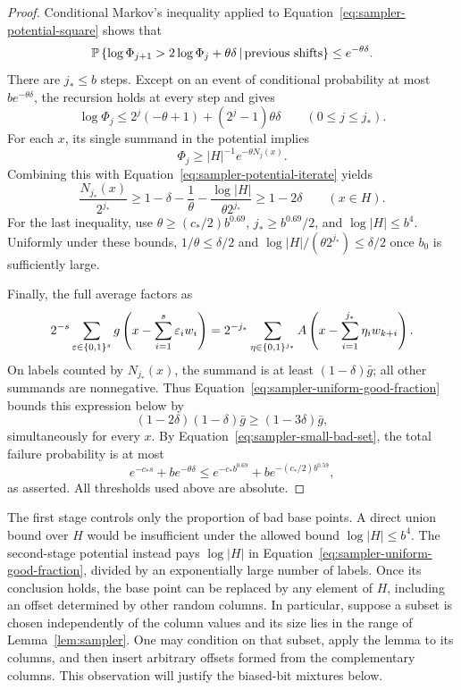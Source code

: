 \begin{proof}
Conditional Markov's inequality applied to
Equation~\eqref{eq:sampler-potential-square} shows that
\[
 \mathbb P\left\{
    \log\Phi_{j+1}>2\log\Phi_j+\theta\delta
    \,\middle|\,\text{previous shifts}
 \right\}
 \le e^{-\theta\delta}.
\]
There are $j_*\le b$ steps. Except on an event of conditional probability
at most $b e^{-\theta\delta}$, the recursion holds at every step and gives
\begin{equation}
\label{eq:sampler-potential-iterate}
 \log\Phi_j
 \le 2^j(-\theta+1)+(2^j-1)\theta\delta
 \qquad(0\le j\le j_*).
\end{equation}
For each $x$, its single summand in the potential implies
\[
 \Phi_j\ge |H|^{-1}e^{-\theta N_j(x)}.
\]
Combining this with Equation~\eqref{eq:sampler-potential-iterate} yields
\begin{equation}
\label{eq:sampler-uniform-good-fraction}
 \frac{N_{j_*}(x)}{2^{j_*}}
 \ge 1-\delta-\frac1\theta
             -\frac{\log|H|}{\theta 2^{j_*}}
 \ge 1-2\delta
 \qquad(x\in H).
\end{equation}
For the last inequality, use
$\theta\ge(c_*/2)b^{0.69}$, $j_*\ge b^{0.69}/2$, and
$\log|H|\le b^4$. Uniformly under these bounds,
$1/\theta\le\delta/2$ and
$\log|H|/(\theta2^{j_*})\le\delta/2$ once $b_0$ is sufficiently large.

Finally, the full average factors as
\[
 2^{-s}\sum_{\varepsilon\in\{0,1\}^s}
 g\left(x-\sum_{i=1}^s\varepsilon_iw_i\right)
 =2^{-j_*}\sum_{\eta\in\{0,1\}^{j_*}}
 A\left(x-\sum_{i=1}^{j_*}\eta_iw_{k+i}\right).
\]
On labels counted by $N_{j_*}(x)$, the summand is at least
$(1-\delta)\bar g$; all other summands are nonnegative. Thus
Equation~\eqref{eq:sampler-uniform-good-fraction} bounds this expression
below by
\[
 (1-2\delta)(1-\delta)\bar g
 \ge(1-3\delta)\bar g,
\]
simultaneously for every $x$. By
Equation~\eqref{eq:sampler-small-bad-set}, the total failure probability
is at most
\[
 e^{-c_*s}+b e^{-\theta\delta}
 \le e^{-c_*b^{0.69}}
      +b e^{-(c_*/2)b^{0.59}},
\]
as asserted. All thresholds used above are absolute.
\end{proof}

\begin{remark}
The first stage controls only the proportion of bad base points. A direct
union bound over $H$ would be insufficient under the allowed bound
$\log|H|\le b^4$. The second-stage potential instead pays
$\log|H|$ in Equation~\eqref{eq:sampler-uniform-good-fraction}, divided by
an exponentially large number of labels. Once its conclusion holds, the
base point can be replaced by any element of $H$, including an offset
determined by other random columns. In particular, suppose a subset is
chosen independently of the column values and its size lies in the range
of Lemma~\ref{lem:sampler}. One may condition on that subset, apply the
lemma to its columns, and then insert arbitrary offsets formed from the
complementary columns. This observation will justify the biased-bit
mixtures below.
\end{remark}
